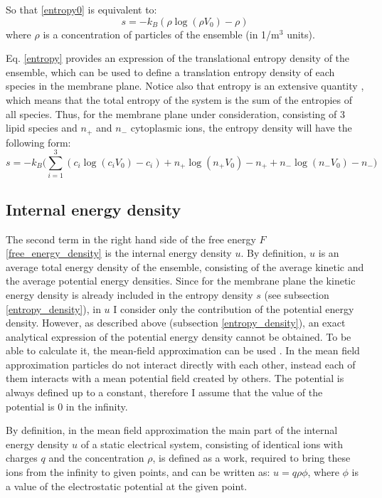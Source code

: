 So that \eqref{entropy0} is equivalent to:
\begin{equation}
 \label{entropy}s = -k_B(\rho\log({\rho V_0})-\rho)
\end{equation}
where $\rho$ is a concentration of particles of the ensemble (in 1/m$^3$ units).

Eq. \eqref{entropy} provides an expression of the translational entropy density of the ensemble, which can be used to define a translation entropy density of each species in the membrane plane. Notice also that entropy is an extensive quantity \cite{Chandler1987}, which means that the total entropy of the system is the sum of the entropies of all species. Thus, for the membrane plane under consideration, consisting of 3 lipid species and $n_+$ and $n_-$ cytoplasmic ions, the entropy density will have the following form:
\begin{equation}
 \label{entropy_sum}s = -k_B\Big(\sum_{i=1}^3(c_i\log({c_i V_0})-c_i) + n_+ \log({n_+  V_0}) - n_+ + n_- \log({n_-  V_0}) - n_-\Big)
\end{equation}

\subsection{Internal energy density}

\label{internal_energy}

The second term in the right hand side of the free energy $F$ \eqref{free_energy_density} is the internal energy density $u$. By definition, $u$ is an average total energy density of the ensemble, consisting of the average kinetic and the average potential energy densities. Since for the membrane plane the kinetic energy density is already included in the entropy density $s$ (see subsection \ref{entropy_density}), in $u$ I consider only the contribution of the potential energy density. However, as described above (subsection \ref{entropy_density}), an exact analytical expression of the potential energy density cannot be obtained. To be able to calculate it, the mean-field approximation can be used \cite{Huang1963}. In the mean field approximation particles do not interact directly with each other, instead each of them interacts with a mean potential field created by others. The potential is always defined up to a constant, therefore I assume that the value of the potential is 0 in the infinity.

By definition, in the mean field approximation the main part of the internal energy density $u$ of a static electrical system, consisting of identical ions with charges $q$ and the concentration $\rho$, is defined as a work, required to bring these ions from the infinity to given points, and can be written as: $u=q \rho \phi$, where $\phi$ is a value of the electrostatic potential at the given point. 

